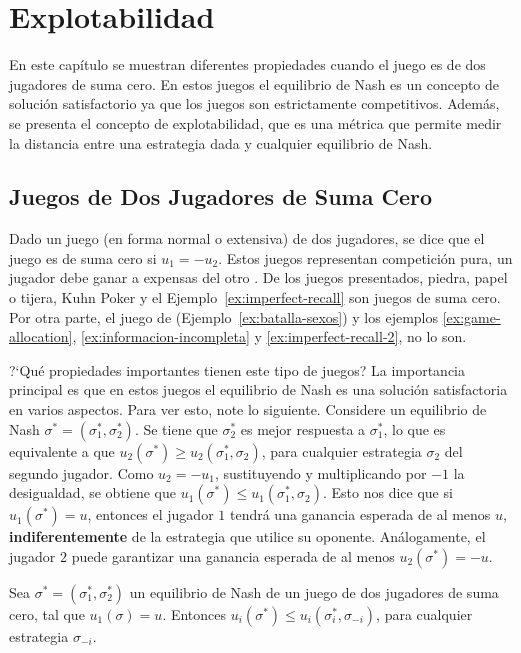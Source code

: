 \chapter{Explotabilidad}
\label{chapter:explotabilidad}

En este capítulo se muestran diferentes propiedades cuando el juego es de dos jugadores de suma cero. En estos juegos el equilibrio de Nash es un concepto de solución satisfactorio ya que los juegos son estrictamente competitivos. Además, se presenta el concepto de explotabilidad, que es una métrica que permite medir la distancia entre una estrategia dada y cualquier equilibrio de Nash.

\section{Juegos de Dos Jugadores de Suma Cero}
\label{section:dos-jugadores-suma-cero}
Dado un juego (en forma normal o extensiva) de dos jugadores, se dice que el juego es de suma cero si $u_1 = -u_2$. Estos juegos representan competición pura, un jugador debe ganar a expensas del otro \cite[p.~5]{bib:handbook-blai}. De los juegos presentados, piedra, papel o tijera, Kuhn Poker y el Ejemplo~\ref{ex:imperfect-recall} son juegos de suma cero. Por otra parte, el juego de  (Ejemplo~\ref{ex:batalla-sexos}) y los  ejemplos \ref{ex:game-allocation}, \ref{ex:informacion-incompleta} y \ref{ex:imperfect-recall-2}, no lo son.

?`Qué propiedades importantes tienen este tipo de juegos? La importancia principal es que en estos juegos el equilibrio de Nash es una solución satisfactoria en varios aspectos. Para ver esto, note lo siguiente. Considere un equilibrio de Nash $\sigma^* = (\sigma^*_1, \sigma^*_2)$. Se tiene que $\sigma^*_2$ es mejor respuesta a $\sigma^*_1$, lo que es equivalente a que $u_2(\sigma^*) \geq u_2(\sigma^*_1, \sigma_2)$, para cualquier estrategia $\sigma_2$ del segundo jugador. Como $u_2 = -u_1$, sustituyendo y multiplicando por $-1$ la desigualdad, se obtiene que $u_1(\sigma^*) \leq u_1(\sigma^*_1, \sigma_2)$. Esto nos dice que si $u_1(\sigma^*) = u$, entonces el jugador $1$ tendrá una ganancia esperada de al menos $u$, \textbf{indiferentemente} de la estrategia que utilice su oponente. Análogamente, el jugador $2$ puede garantizar una ganancia esperada de al menos $u_2(\sigma^*) = -u$.

\begin{theorem}
\label{theo:cota-ganancia-esperada}
Sea $\sigma^* = (\sigma^*_1, \sigma^*_2)$ un equilibrio de Nash de un juego de dos jugadores de suma cero, tal que $u_1(\sigma) = u$. Entonces $u_i(\sigma^*) \leq u_i(\sigma^*_i, \sigma_{-i})$, para cualquier estrategia $\sigma_{-i}$.  
\end{theorem}

